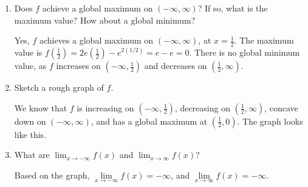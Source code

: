 \documentclass{article}
\begin{document}
\begin{enumerate}[resume]
\begin{enumerate}
  \item
    \begin{problem}[\stretch{0.5}]
      Does $f$ achieve a global maximum on $(-\infty, \infty)$? If so, what is the maximum value? How about a global minimum?
    \end{problem}

    \begin{solution}
      Yes, $f$ achieves a global maximum on $(-\infty, \infty)$, at $x=\frac{1}{2}$. 
      The maximum value is $f(\frac{1}{2}) = 2e(\frac{1}{2}) - e^{2(1/2)} = e-e = 0$.
      There is no global minimum value, as $f$ increases on $(-\infty, \frac{1}{2})$ and
      decreases on $(\frac{1}{2}, \infty)$. 
    \end{solution}

  \item
    \begin{problem}[\vfill]
      Sketch a rough graph of $f$. 
    \end{problem}

    \begin{solution}
      We know that $f$ is increasing on $(-\infty, \frac{1}{2})$, decreasing on 
      $(\frac{1}{2}, \infty)$, concave down on $(-\infty, \infty)$, and has a global
      maximum at $(\frac{1}{2}, 0)$. The graph looks like this.
      \begin{center}
      \end{center}
    \end{solution}

  \item


    \begin{problem}[\stretch{0.5}]
      What are $\displaystyle \lim_{x \to -\infty} f(x)$ and $\displaystyle \lim_{x \to \infty} f(x)$?
    \end{problem}

    \begin{solution}
      Based on the graph, $\lim\limits_{x\to-\infty}f(x) = -\infty$, and 
      $\lim\limits_{x\to\infty} f(x) = -\infty$.
    \end{solution}

  \end{enumerate}

\end{enumerate}
\end{document}
